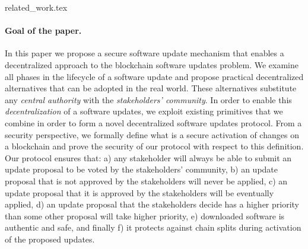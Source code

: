 
{related_work.tex}

\paragraph{Goal of the paper.} In this paper we propose a secure software update mechanism that enables a decentralized approach to the blockchain software updates problem. We examine all phases in the lifecycle of a software update and propose practical decentralized alternatives that can be adopted in the real world. These alternatives substitute any \emph{central authority} with the \emph{stakeholders' community}. In order to enable this \emph{decentralization} of a software updates, we exploit existing primitives that we combine in order to form a novel decentralized software updates protocol. From a security perspective, we formally define what is a secure activation of changes on a blockchain and prove the security of our protocol with respect to this definition.  Our protocol ensures that:
a) any stakeholder will always be able to submit an update proposal to be voted by the stakeholders' community, b) an update proposal that is not approved by the stakeholders
 will never be applied, c) an update proposal that it is approved by the stakeholders will be eventually applied, d) an update proposal that the stakeholders decide has a higher priority than some other proposal will take higher priority, e) downloaded software is authentic and safe, and finally f) it protects against chain splits during activation of the proposed updates.

